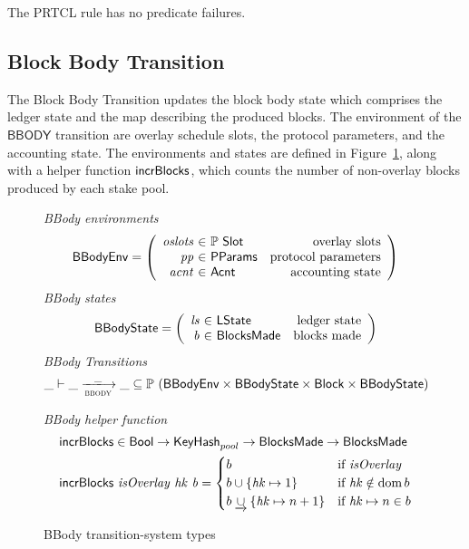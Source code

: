 The PRTCL rule has no predicate failures.

\clearpage

\subsection{Block Body Transition}
\label{sec:block-body-trans}

The Block Body Transition updates the block body state which comprises the ledger state and the
map describing the produced blocks.
The environment of the $\mathsf{BBODY}$ transition are overlay schedule slots,
the protocol parameters, and the accounting state.
The environments and states are defined in Figure~\ref{fig:ts-types:bbody}, along with
a helper function $\mathsf{incrBlocks}$, which counts the number of non-overlay blocks
produced by each stake pool.

\begin{figure}
  \emph{BBody environments}
  \begin{equation*}
    \BBodyEnv =
    \left(
      \begin{array}{r@{~\in~}lr}
        \var{oslots} & \powerset{\Slot} & \text{overlay slots} \\
        \var{pp} & \PParams & \text{protocol parameters} \\
        \var{acnt} & \Acnt & \text{accounting state}
      \end{array}
    \right)
  \end{equation*}
  \emph{BBody states}
  \begin{equation*}
    \BBodyState =
    \left(
      \begin{array}{r@{~\in~}lr}
        \var{ls} & \LState & \text{ledger state} \\
        \var{b} & \BlocksMade & \text{blocks made} \\
      \end{array}
    \right)
  \end{equation*}
  \emph{BBody Transitions}
  \begin{equation*}
    \_ \vdash \var{\_} \trans{bbody}{\_} \var{\_} \subseteq
    \powerset (\BBodyEnv \times \BBodyState \times \Block \times \BBodyState)
  \end{equation*}
  \caption{BBody transition-system types}
  \label{fig:ts-types:bbody}
  \emph{BBody helper function}
  \begin{align*}
      & \mathsf{incrBlocks} \in \mathsf{Bool} \to \mathsf{KeyHash}_{pool} \to
          \mathsf{BlocksMade} \to \mathsf{BlocksMade} \\
      & \mathsf{incrBlocks}~\mathit{isOverlay}~\mathit{hk}~\mathit{b} =
        \begin{cases}
          b & \text{if }\mathit{isOverlay} \\
          b\cup\{\mathit{hk}\mapsto 1\} & \text{if }\mathit{hk}\notin\operatorname{dom}{b} \\
          b\mathbin{\underrightarrow\cup}\{\mathit{hk}\mapsto n+1\} & \text{if }\mathit{hk}\mapsto n\in b \\
        \end{cases}
  \end{align*}

\end{figure}

